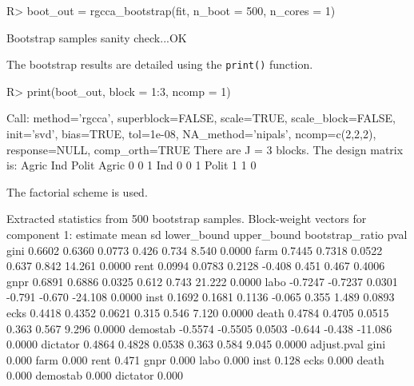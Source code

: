 \documentclass[
]{jss}
\begin{document}
\begin{CodeChunk}
\begin{CodeInput}
R> boot_out = rgcca_bootstrap(fit, n_boot = 500, n_cores = 1)
\end{CodeInput}
\begin{CodeOutput}
Bootstrap samples sanity check...OK
\end{CodeOutput}
\end{CodeChunk}

The bootstrap results are detailed using the \texttt{print()} function.

\footnotesize

\begin{CodeChunk}
\begin{CodeInput}
R> print(boot_out, block = 1:3, ncomp = 1)
\end{CodeInput}
\begin{CodeOutput}
Call: method='rgcca', superblock=FALSE, scale=TRUE, scale_block=FALSE, init='svd',
bias=TRUE, tol=1e-08, NA_method='nipals', ncomp=c(2,2,2), response=NULL,
comp_orth=TRUE 
There are J = 3 blocks.
The design matrix is:
      Agric Ind Polit
Agric     0   0     1
Ind       0   0     1
Polit     1   1     0

The factorial scheme is used.

Extracted statistics from 500 bootstrap samples.
Block-weight vectors for component 1: 
         estimate    mean     sd lower_bound upper_bound bootstrap_ratio   pval
gini       0.6602  0.6360 0.0773       0.426       0.734           8.540 0.0000
farm       0.7445  0.7318 0.0522       0.637       0.842          14.261 0.0000
rent       0.0994  0.0783 0.2128      -0.408       0.451           0.467 0.4006
gnpr       0.6891  0.6886 0.0325       0.612       0.743          21.222 0.0000
labo      -0.7247 -0.7237 0.0301      -0.791      -0.670         -24.108 0.0000
inst       0.1692  0.1681 0.1136      -0.065       0.355           1.489 0.0893
ecks       0.4418  0.4352 0.0621       0.315       0.546           7.120 0.0000
death      0.4784  0.4705 0.0515       0.363       0.567           9.296 0.0000
demostab  -0.5574 -0.5505 0.0503      -0.644      -0.438         -11.086 0.0000
dictator   0.4864  0.4828 0.0538       0.363       0.584           9.045 0.0000
         adjust.pval
gini           0.000
farm           0.000
rent           0.471
gnpr           0.000
labo           0.000
inst           0.128
ecks           0.000
death          0.000
demostab       0.000
dictator       0.000
\end{CodeOutput}
\end{CodeChunk}
\end{document}
